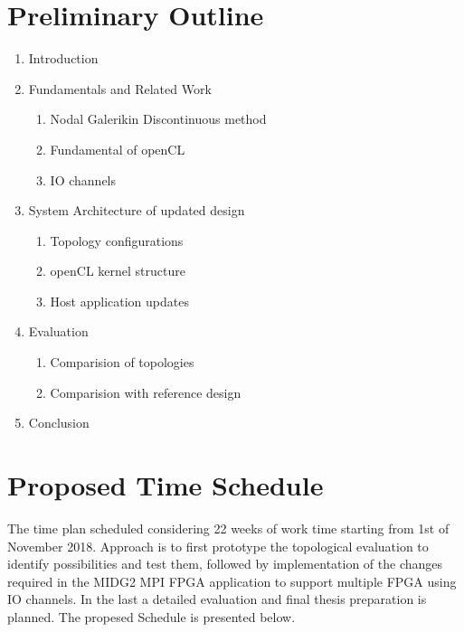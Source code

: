 \documentclass[english,notitlepage]{hgbreport}
\begin{document}
\section{Preliminary Outline}
\begin{enumerate}
	\item Introduction
	\item Fundamentals and Related Work
	\begin{enumerate}
		\item Nodal Galerikin Discontinuous method
		\item Fundamental of openCL
		\item IO channels
	\end{enumerate}
	\item System Architecture of updated design
	\begin{enumerate}
		\item Topology configurations
		\item openCL kernel structure
		\item Host application updates
	\end{enumerate}
	\item Evaluation
	\begin{enumerate}
		\item Comparision of topologies
		\item Comparision with reference design
	\end{enumerate}
	\item Conclusion

\end{enumerate}

\section{Proposed Time Schedule}

The time plan scheduled considering 22 weeks of work time starting from 1st of November 2018.
Approach is to first prototype the topological evaluation to identify possibilities and test them,
followed by implementation of the changes required in the MIDG2 MPI FPGA application to support
multiple FPGA using IO channels. In the last a detailed evaluation and final thesis preparation is
planned. The propesed Schedule is presented below.
\end{document}
